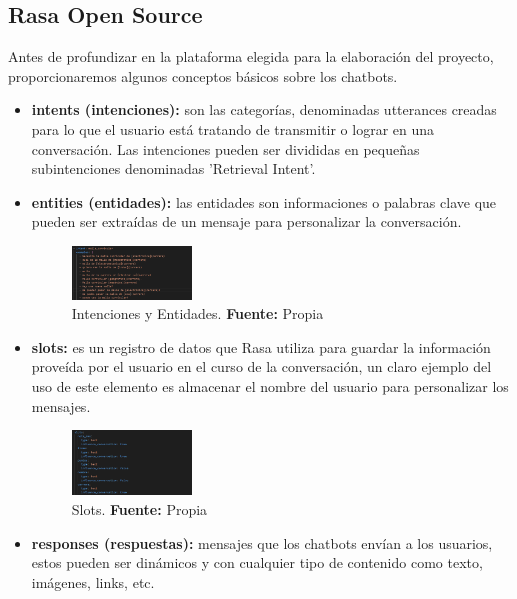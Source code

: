 \subsection{Rasa Open Source}
Antes de profundizar en la plataforma elegida para la elaboración del proyecto, proporcionaremos algunos conceptos básicos sobre los chatbots.
\begin{itemize}
    \item \textbf{intents (intenciones): }son las categorías, denominadas utterances creadas para lo que el usuario está tratando de transmitir o lograr en una conversación. Las intenciones pueden ser divididas en pequeñas subintenciones denominadas 'Retrieval Intent'.
    \item \textbf{entities (entidades): } las entidades son informaciones o palabras clave que pueden ser extraídas de un mensaje para personalizar la conversación.
\begin{figure}[H]
\begin{centering}
\includegraphics[angle=0,width=0.3\textwidth]{Figuras/Intent-Entities.png}
\par \end{centering}
\caption[Intenciones y Entidades]{Intenciones y Entidades. \textbf{Fuente:} Propia}
\label{Intent_Entities}
\end{figure}
    \item \textbf{slots:} es un registro de datos que Rasa utiliza para guardar la información proveída por el usuario en el curso de la conversación, un claro ejemplo del uso de este elemento es almacenar el nombre del usuario para personalizar los mensajes.
\begin{figure}[H]
\begin{centering}
\includegraphics[angle=0,width=0.3\textwidth]{Figuras/Slots.png}
\par \end{centering}
\caption[Slots]{Slots. \textbf{Fuente:} Propia}
\label{Slots}
\end{figure}
    \item \textbf{responses (respuestas):} mensajes que los chatbots envían a los usuarios, estos pueden ser dinámicos y con cualquier tipo de contenido como texto, imágenes, links, etc.

\end{itemize}

